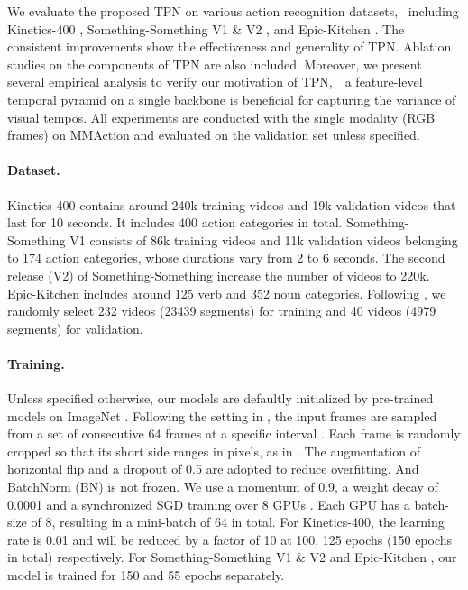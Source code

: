 \documentclass[10pt,twocolumn,letterpaper]{article}
\begin{document}
We evaluate the proposed TPN on various action recognition datasets, \
including Kinetics-400 \cite{kinetics}, Something-Something V1 \& V2 \cite{sthv1}, and Epic-Kitchen \cite{epic}. The consistent improvements show the effectiveness and generality of TPN.
Ablation studies on the components of TPN are also included.
Moreover, we present several empirical analysis to verify our motivation of TPN,\
\ie~a feature-level temporal pyramid on a single backbone is beneficial for capturing the variance of visual tempos.
All experiments are conducted with the single modality (\ie RGB frames) on MMAction \cite{mmaction2019} and evaluated on the validation set unless specified.


\paragraph{Dataset.}
Kinetics-400 \cite{kinetics} contains around 240k training videos and 19k validation videos that last for 10 seconds. It includes 400 action categories in total.
Something-Something V1 \cite{sthv1} consists of 86k training videos and 11k validation videos belonging to 174 action categories, whose durations vary from 2 to 6 seconds.
The second release (V2) of Something-Something increase the number of videos to 220k.
Epic-Kitchen \cite{epic} includes around 125 verb and 352 noun categories. Following \cite{anticipation}, we randomly select 232 videos (23439 segments) for training and 40 videos (4979 segments) for validation.

\paragraph{Training.}
Unless specified otherwise, our models are defaultly initialized by pre-trained models on ImageNet \cite{imagenet}.
Following the setting in \cite{slowfast}, the input frames are sampled from a set of consecutive 64 frames at a specific interval .
Each frame is randomly cropped so that its short side ranges in  pixels, as in \cite{nonlocal,slowfast,vggnet}.
The augmentation of horizontal flip and a dropout \cite{dropout} of 0.5 are adopted to reduce overfitting.
And BatchNorm (BN) \cite{bn} is not frozen.
We use a momentum of 0.9, a weight decay of 0.0001 and a synchronized SGD training over 8 GPUs \cite{sgd1hour}.
Each GPU has a batch-size of 8, resulting in a mini-batch of 64 in total.
For Kinetics-400, the learning rate is 0.01 and will be reduced by a factor of 10 at 100, 125 epochs (150 epochs in total) respectively.
For Something-Something V1 \& V2 \cite{sthv1} and Epic-Kitchen \cite{epic}, our model is trained for 150 and 55 epochs separately. 
\end{document}
